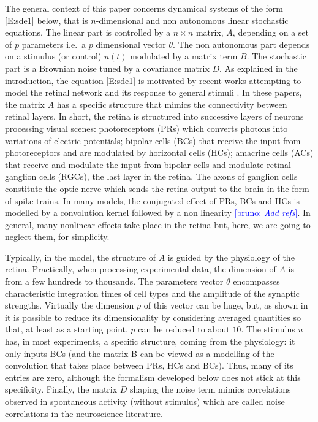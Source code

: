 \documentclass[twocolumn]{autart}
\newcommand{\B}[1]{{\textcolor{blue}{[bruno: \textit{#1}]}}}
\newcommand{\Luc}{\color{magenta} }
\theoremstyle{definition}
\theoremstyle{remark}
\begin{document}
The general context of this paper concerns dynamical systems of the form \eqref{E:sde1} below, that is $n$-dimensional and non autonomous linear stochastic equations. The linear part is controlled by a $n \times n$ matrix, $A$, depending on a set of $p$ parameters i.e.\ a $p$ dimensional vector $\theta$.
The non autonomous part depends on a stimulus (or control) $u(t)$ modulated by a matrix term $B$. The stochastic part is a Brownian noise tuned by a covariance matrix $D$. As explained in the introduction, the equation   \eqref{E:sde1} is motivated by recent works attempting to model the retinal network and its response to general stimuli \cite{souihel-cessac:21,cessac:22,kartsaki-hilgen-etal:24,ebert-buffet-etal:24,emonet-souihel-etal:25}. In these papers, the matrix $A$ has a specific structure that mimics the connectivity between retinal layers. In short, the retina is structured into successive layers of neurons processing visual scenes: photoreceptors (PRs) which converts photons into variations of electric potentials; bipolar cells (BCs) that receive the input from photoreceptors and are modulated by horizontal cells (HCs); amacrine cells (ACs) that receive and modulate the input from bipolar cells and modulate retinal ganglion cells (RGCs), the last layer in the retina. The axons of ganglion cells constitute the optic nerve which sends the retina output to the brain in the form of spike trains. In many models, the conjugated effect of PRs, BCs and HCs is modelled by a convolution kernel followed by a non linearity \B{Add refs}. In general, many nonlinear effects take place in the retina but, here, we are going to neglect them, for simplicity.

Typically, in the model, the structure of $A$ is guided by the physiology of the retina. 
Practically, when processing experimental data, the dimension of $A$ is from a few hundreds to thousands. The parameters vector $\theta$ encompasses characteristic integration times of cell types and the amplitude of the synaptic strengths. Virtually the dimension $p$ of this vector can be huge, but, as shown in \cite{kartsaki-hilgen-etal:24} it is possible to reduce its dimensionality by considering averaged quantities so that, at least as a starting point, $p$ can be reduced to about $10$.  The stimulus $u$ has, in most experiments, a specific structure, coming from the physiology: it only inputs BCs (and the matrix B can be viewed as a modelling of the convolution that takes place between PRs, HCs and BCs). Thus, many of its entries are zero, although the formalism developed below does not stick at this specificity. Finally, the matrix $D$ shaping the noise term mimics correlations observed in spontaneous activity (without stimulus) {\Luc which are called noise correlations in the neuroscience literature}. 
 
\end{document}
